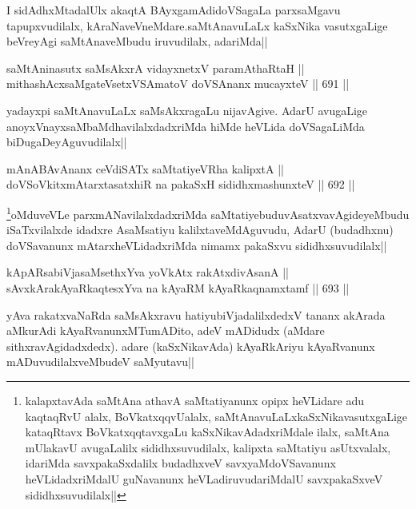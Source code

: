 \begin{artha}
I sidAdhxMtadalUlx akaqtA BAyxgamAdidoVSagaLa parxsaMgavu tapupxvudilalx, kAraNaveVneMdare.saMtAnavuLaLx kaSxNika vasutxgaLige beVreyAgi saMtAnaveMbudu iruvudilalx, adariMda||
\end{artha}

\begin{shl}
saMtAninasutx saMsAkxrA vidayxnetxV paramAthaRtaH || \\
mithashAcxsaMgateVsetxVSAmatoV doVSAnanx mucayxteV ||  691 ||  
\end{shl}

\begin{artha}
yadayxpi saMtAnavuLaLx saMsAkxragaLu nijavAgive. AdarU avugaLige anoyxVnayxsaMbaMdhavilalxdadxriMda hiMde heVLida doVSagaLiMda biDugaDeyAguvudilalx||
\end{artha}

\begin{shl}
mAnABAvAnanx ceVdiSATx saMtatiyeVRha kalipxtA || \\
doVSoVkitxmAtarxtasatxhiR na pakaSxH sididhxmashunxteV ||  692 ||  
\end{shl}

\begin{artha}
\footnote{kalapxtavAda saMtAna athavA saMtatiyanunx opipx heVLidare adu kaqtaqRvU alalx,  BoVkatxqqvUalalx, saMtAnavuLaLxkaSxNikavasutxgaLige kataqRtavx BoVkatxqqtavxgaLu kaSxNikavAdadxriMdale ilalx, saMtAna mUlakavU avugaLalilx sididhxsuvudilalx, kalipxta saMtatiyu asUtxvalalx, idariMda savxpakaSxdalilx budadhxveV savxyaMdoVSavanunx heVLidadxriMdalU guNavanunx heVLadiruvudariMdalU savxpakaSxveV sididhxsuvudilalx||}oMduveVLe parxmANavilalxdadxriMda saMtatiyebuduvAsatxvavAgideyeMbudu iSaTxvilalxde idadxre AsaMsatiyu kalilxtaveMdAguvudu, AdarU (budadhxnu) doVSavanunx mAtarxheVLidadxriMda nimamx pakaSxvu sididhxsuvudilalx||
\end{artha}


\begin{shl}
kApARsabiVjasaMsethxYva yoVkAtx rakAtxdivAsanA || \\
sAvxkArakAyaRkaqtesxYva na kAyaRM kAyaRkaqnamxtamf ||  693 ||  
\end{shl}

\begin{artha}
yAva rakatxvaNaRda saMsAkxravu hatiyubiVjadalilxdedxV tananx akArada aMkurAdi kAyaRvanunxMTumADito, adeV mADidudx (aMdare sithxravAgidadxdedx). adare (kaSxNikavAda) kAyaRkAriyu kAyaRvanunx mADuvudilalxveMbudeV saMyutavu||
\end{artha}

